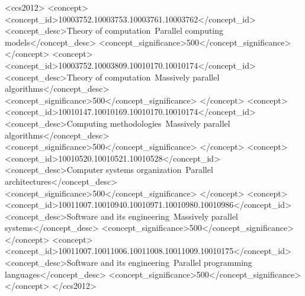 
\begin{CCSXML}
    <ccs2012>
    <concept>
        <concept_id>10003752.10003753.10003761.10003762</concept_id>
        <concept_desc>Theory of computation~Parallel computing models</concept_desc>
        <concept_significance>500</concept_significance>
    </concept>
    <concept>
        <concept_id>10003752.10003809.10010170.10010174</concept_id>
        <concept_desc>Theory of computation~Massively parallel algorithms</concept_desc>
        <concept_significance>500</concept_significance>
    </concept>
    <concept>
        <concept_id>10010147.10010169.10010170.10010174</concept_id>
        <concept_desc>Computing methodologies~Massively parallel algorithms</concept_desc>
        <concept_significance>500</concept_significance>
    </concept>
    <concept>
        <concept_id>10010520.10010521.10010528</concept_id>
        <concept_desc>Computer systems organization~Parallel architectures</concept_desc>
        <concept_significance>500</concept_significance>
    </concept>
    <concept>
        <concept_id>10011007.10010940.10010971.10010980.10010986</concept_id>
        <concept_desc>Software and its engineering~Massively parallel systems</concept_desc>
        <concept_significance>500</concept_significance>
    </concept>
    <concept>
        <concept_id>10011007.10011006.10011008.10011009.10010175</concept_id>
        <concept_desc>Software and its engineering~Parallel programming languages</concept_desc>
        <concept_significance>500</concept_significance>
    </concept>
    </ccs2012>
\end{CCSXML}


